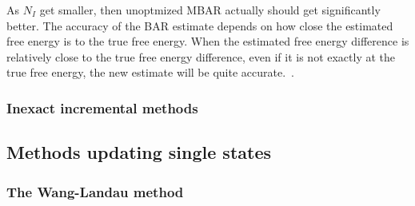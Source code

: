 \documentclass[superscriptaddress,showkeys, nofootinbib, pre, aps]{revtex4-1}
\begin{document}
As $N_I$ get smaller, then unoptmized MBAR actually should get significantly better.  The accuracy of the BAR estimate depends on how close the estimated free energy is to the true free energy.  When the estimated free energy difference is relatively close to the true free
energy difference, even if it is not exactly at the true free energy, the new estimate will be quite accurate.~\cite{bennett:jcp:1976:fe-estimate}.

\subsubsection{Inexact incremental methods}

%


%



\subsection{\label{sec:singlestate} Methods updating single states}
\subsubsection{\label{sec:wl}The Wang-Landau method}
\end{document}
